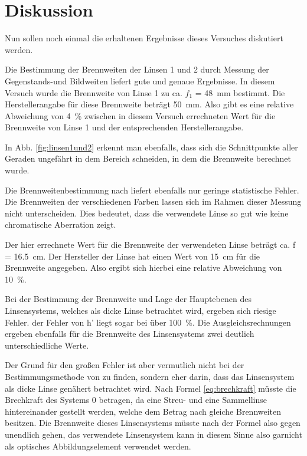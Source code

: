 
\section{Diskussion}
Nun sollen noch einmal die erhaltenen Ergebnisse dieses Versuches diskutiert werden.

Die Bestimmung der Brennweiten der Linsen 1 und 2 durch Messung der Gegenstands-und Bildweiten liefert gute und genaue Ergebnisse. In diesem Versuch wurde die Brennweite von Linse 1 zu ca. $f_1$ = \SI{48}{\milli\metre} bestimmt. Die Herstellerangabe für diese Brennweite beträgt \SI{50}{\milli\metre}. Also gibt es eine relative Abweichung von \SI{4}{\percent} zwischen in diesem Versuch errechneten Wert für die Brennweite von Linse 1 und der entsprechenden Herstellerangabe.

In Abb. \ref{fig:linsen1und2} erkennt man ebenfalls, dass sich die Schnittpunkte aller Geraden ungefährt in dem Bereich schneiden, in dem die Brennweite berechnet wurde.

Die Brennweitenbestimmung nach  liefert ebenfalls nur geringe statistische Fehler. Die Brennweiten der verschiedenen Farben lassen sich im Rahmen dieser Messung nicht unterscheiden. Dies bedeutet, dass die verwendete Linse so gut wie keine chromatische Aberration zeigt.

 Der hier errechnete Wert für die Brennweite der verwendeten Linse beträgt ca. f = \SI{16.5}{\centi\metre}. Der Hersteller der Linse hat einen Wert von \SI{15}{\centi\metre} für die Brennweite angegeben. Also ergibt sich hierbei eine relative Abweichung von \SI{10}{\percent}.

Bei der Bestimmung der Brennweite und Lage der Hauptebenen des Linsensystems, welches als dicke Linse betrachtet wird, ergeben sich riesige Fehler. der Fehler von h' liegt sogar bei über \SI{100}{\percent}. Die Ausgleichsrechnungen ergeben ebenfalls für die Brennweite des Linsensystems zwei deutlich unterschiedliche Werte. 

Der Grund für den großen Fehler ist aber vermutlich nicht bei der Bestimmungsmethode von  zu finden, sondern eher darin, dass das Linsensystem als dicke Linse genähert betrachtet wird.
Nach Formel \eqref{eq:brechkraft} müsste die Brechkraft des Systems 0 betragen, da eine Streu- und eine Sammellinse hintereinander gestellt werden, welche dem Betrag nach gleiche Brennweiten besitzen. Die Brennweite dieses Linsensystems müsste nach der Formel also gegen unendlich gehen, das verwendete Linsensystem kann in diesem Sinne also garnicht als optisches Abbildungselement verwendet werden.

